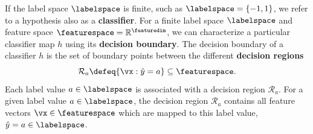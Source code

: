 \documentclass[12pt]{report}
\begin{document}
If the label space $\labelspace$ is finite, such as $\labelspace=\{-1,1\}$, 
we refer to a hypothesis also as a {\bf classifier}. For a finite label space 
$\labelspace$ and feature space $\featurespace=\mathbb{R}^{\featuredim}$, 
we can characterize a particular classifier map $h$ using its {\bf decision boundary}. 
The decision boundary of a classifier $h$ is the set of boundary points 
between the different {\bf decision regions}
\begin{equation} 
\label{equ_decision_region}
\mathcal{R}_{a} \defeq \{ \vx: \hat{y}= a \} \subseteq \featurespace. 
\end{equation}%
Each label value $a \in \labelspace$ is associated with a decision 
region $\mathcal{R}_{a}$. For a given label value $a \in \labelspace$, 
the decision region $\mathcal{R}_{a}$ contains all feature vectors 
$\vx \in \featurespace$ which are mapped to this label value, $\hat{y}=a \in \labelspace$. 

\end{document}
